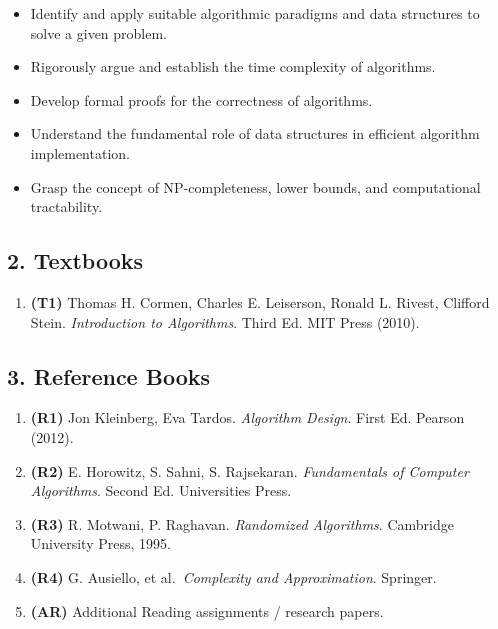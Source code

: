 \documentclass[
]{article}
\providecommand{\tightlist}{%
  \setlength{\itemsep}{0pt}\setlength{\parskip}{0pt}}
\begin{document}
\begin{itemize}
\tightlist
\item
  Identify and apply suitable algorithmic paradigms and data structures
  to solve a given problem.\\
\item
  Rigorously argue and establish the time complexity of algorithms.\\
\item
  Develop formal proofs for the correctness of algorithms.\\
\item
  Understand the fundamental role of data structures in efficient
  algorithm implementation.\\
\item
  Grasp the concept of NP-completeness, lower bounds, and computational
  tractability.
\end{itemize}

\subsection{2. Textbooks}\label{textbooks}

\begin{enumerate}
\def\labelenumi{\arabic{enumi}.}
\tightlist
\item
  \textbf{(T1)} Thomas H. Cormen, Charles E. Leiserson, Ronald L.
  Rivest, Clifford Stein. \emph{Introduction to Algorithms}. Third Ed.
  MIT Press (2010).
\end{enumerate}

\subsection{3. Reference Books}\label{reference-books}

\begin{enumerate}
\def\labelenumi{\arabic{enumi}.}
\tightlist
\item
  \textbf{(R1)} Jon Kleinberg, Eva Tardos. \emph{Algorithm Design}.
  First Ed. Pearson (2012).\\
\item
  \textbf{(R2)} E. Horowitz, S. Sahni, S. Rajsekaran. \emph{Fundamentals
  of Computer Algorithms}. Second Ed. Universities Press.\\
\item
  \textbf{(R3)} R. Motwani, P. Raghavan. \emph{Randomized Algorithms}.
  Cambridge University Press, 1995.\\
\item
  \textbf{(R4)} G. Ausiello, et al.~\emph{Complexity and Approximation}.
  Springer.\\
\item
  \textbf{(AR)} Additional Reading assignments / research papers.
\end{enumerate}
\end{document}
